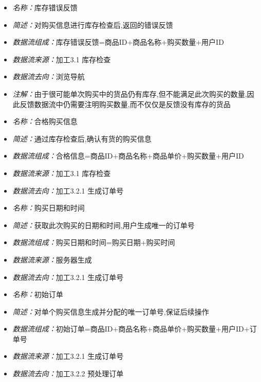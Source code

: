\vspace{-1mm}

\begin{itemize}
	\item \textit{名称：}库存错误反馈
	\item \textit{简述：}对购买信息进行库存检查后,返回的错误反馈
	\item \textit{数据流组成：}库存错误反馈=商品ID+商品名称+购买数量+用户ID
	\item \textit{数据流来源：}加工3.1 库存检查
	\item \textit{数据流去向：}浏览导航
	\item \textit{注解：}由于很可能单次购买中的货品仍有库存,但不能满足此次购买的数量,因此反馈数据流中仍需要注明购买数量,而不仅仅是反馈没有库存的货品
\end{itemize}

\vspace{-1mm}

\begin{itemize}
	\item \textit{名称：}合格购买信息
	\item \textit{简述：}通过库存检查后,确认有货的购买信息
	\item \textit{数据流组成：}合格信息=商品ID+商品名称+商品单价+购买数量+用户ID
	\item \textit{数据流来源：}加工3.1 库存检查
	\item \textit{数据流去向：}加工3.2.1 生成订单号
\end{itemize}

\vspace{-1mm}

\begin{itemize}
	\item \textit{名称：}购买日期和时间
	\item \textit{简述：}获取此次购买的日期和时间,用户生成唯一的订单号
	\item \textit{数据流组成：}购买日期和时间=购买日期+购买时间
	\item \textit{数据流来源：}服务器生成
	\item \textit{数据流去向：}加工3.2.1 生成订单号
\end{itemize}

\vspace{-1mm}

\begin{itemize}
	\item \textit{名称：}初始订单
	\item \textit{简述：}对单个购买信息生成并分配的唯一订单号,保证后续操作
	\item \textit{数据流组成：}初始订单=商品ID+商品名称+商品单价+购买数量+用户ID+订单号
	\item \textit{数据流来源：}加工3.2.1 生成订单号
	\item \textit{数据流去向：}加工3.2.2 预处理订单
\end{itemize}


